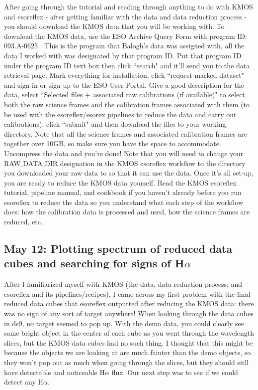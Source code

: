 \documentclass[10pt,letterpaper]{article}
\begin{document}
After going through the tutorial and reading through anything to do with KMOS and esoreflex - after getting familiar with the data and data reduction process - you should download the KMOS data that you will be working with. To download the KMOS data, use the ESO Archive Query Form \cite{ESO Archive Query Form} with program ID: 093.A-0625 . This is the program that Balogh's data was assigned with, all the data I worked with was designated by that program ID. Put that program ID under the program ID text box then click ``search" and it'll send you to the data retrieval page. Mark everything for installation, click ``request marked dataset" and sign in or sign up to the ESO User Portal. Give a good description for the data, select ``Selected files + associated raw calibrations (if available)" to select both the raw science frames and the calibration frames associated with them (to be used with the esoreflex/esorex pipelines to reduce the data and carry out calibrations), click ``submit" and then download the files to your working directory. Note that all the science frames and associated calibration frames are together over 10GB, so make sure you have the space to accommodate. Uncompress the data and you're done! Note that you will need to change your RAW$\_$DATA$\_$DIR designation in the KMOS esoreflex workflow to the directory you downloaded your raw data to so that it can use the data. Once it's all set-up, you are ready to reduce the KMOS data yourself. Read the KMOS esoreflex tutorial, pipeline manual, and cookbook if you haven't already before you run esoreflex to reduce the data so you understand what each step of the workflow does: how the calibration data is processed and used, how the science frames are reduced, etc. 

\subsection{May 12: Plotting spectrum of reduced data cubes and searching for signs of H$\alpha$}
After I familiarized myself with KMOS (the data, data reduction process, and esoreflex and its pipelines/recipes), I came across my first problem with the final reduced data cubes that esoreflex outputted after reducing the KMOS data: there was no sign of any sort of target anywhere! When looking through the data cubes in ds9, no target seemed to pop up. With the demo data, you could clearly see some bright object in the center of each cube as you went through the wavelength slices, but the KMOS data cubes had no such thing. I thought that this might be because the objects we are looking at are much fainter than the demo objects, so they won't pop out as much when going through the slices, but they should sitll have detectable and noticeable H$\alpha$ flux. Our next step was to see if we could detect any H$\alpha$.\\
\end{document}
